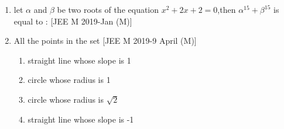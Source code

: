 \documentclass[journal,12pt,twocolumn,article]{IEEEtran}
\theoremstyle{remark}
\begin{document}
\begin{enumerate}[start = 14]
\item let $\alpha$ and $\beta$ be two roots of the equation $x^2+2x+2=0$,then $\alpha^{15}+\beta^{15}$ is equal to :                                       
\hfill{[JEE M 2019-Jan (M)]}                       
\begin{enumerate}                                   
\end{enumerate}

\item  All the points in the set 
\hfill{[JEE M 2019-9 April (M)]}                    
\begin{enumerate}                                   
                              
\item \text straight line whose slope is 1          
                             
\item \text circle whose radius is 1                 

\item \text circle whose radius is $\sqrt2$

\item \text straight line whose slope is -1 

\end{enumerate}
\end{enumerate}
\end{document}
